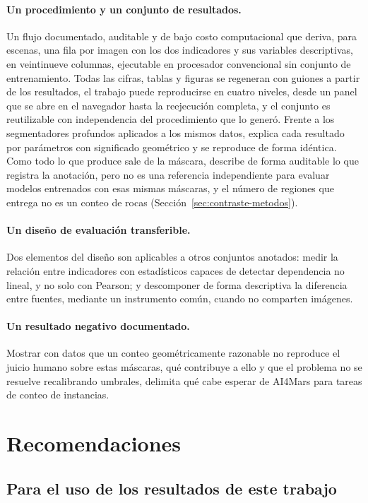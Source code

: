 \paragraph{Un procedimiento y un conjunto de resultados.} Un flujo documentado, auditable y de
bajo costo computacional que deriva, para \cNEscenas{} escenas, una fila por
imagen con los dos indicadores y sus variables descriptivas, en veintinueve columnas, ejecutable en procesador convencional sin conjunto de entrenamiento. Todas las cifras,
tablas y figuras se regeneran con guiones a partir de los resultados, el trabajo puede
reproducirse en cuatro niveles, desde un panel que se abre en el navegador hasta la reejecución
completa, y el conjunto es reutilizable con independencia del procedimiento que lo generó.
Frente a los segmentadores profundos aplicados a los mismos datos, explica cada resultado por
parámetros con significado geométrico y se reproduce de forma idéntica. Como todo lo que produce
sale de la máscara, describe de forma auditable lo que registra la anotación, pero no es una
referencia independiente para evaluar modelos entrenados con esas mismas máscaras, y el número de
regiones que entrega no es un conteo de rocas (Sección~\ref{sec:contraste-metodos}).

\paragraph{Un diseño de evaluación transferible.} Dos elementos del diseño son aplicables a
otros conjuntos anotados: medir la relación entre indicadores con estadísticos capaces de
detectar dependencia no lineal, y no solo con Pearson; y descomponer de forma descriptiva la
diferencia entre fuentes, mediante un instrumento común, cuando no comparten imágenes.

\paragraph{Un resultado negativo documentado.} Mostrar con datos que un conteo
geométricamente razonable no reproduce el juicio humano sobre estas máscaras, qué contribuye a
ello y que el problema no se resuelve recalibrando umbrales, delimita qué cabe esperar de AI4Mars para tareas de conteo
de instancias.

\section{Recomendaciones}

\subsection{Para el uso de los resultados de este trabajo}

